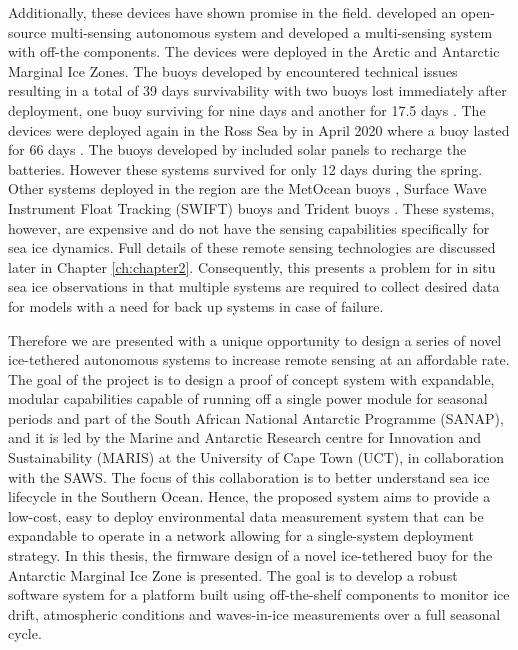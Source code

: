 Additionally, these devices have shown promise in the field. \textcite{rabault2019open} developed an open-source multi-sensing autonomous system and \textcite{kohout2015device} developed a multi-sensing system with off-the components. The devices were deployed in the Arctic and Antarctic Marginal Ice Zones. The buoys developed by \textcite{kohout2015device} encountered technical issues resulting in a total of 39 days survivability with two buoys lost immediately after deployment, one buoy surviving for nine days and another for 17.5 days \cite{kohout2015device}. The devices were deployed again in the Ross Sea by \textcite{kohout_smith_roach_williams_montiel_williams_2020} in April 2020 where a buoy lasted for 66 days \cite{kohout_smith_roach_williams_montiel_williams_2020}. The buoys developed by \textcite{rabault2019open} included solar panels to recharge the batteries. However these systems survived for only 12 days during the spring. Other systems deployed in the region are the MetOcean buoys \cite{uptempo}, Surface Wave Instrument Float Tracking (SWIFT) \cite{thomson2012wave} buoys and Trident buoys \cite{trident}. These systems, however, are expensive and do not have the sensing capabilities specifically for sea ice dynamics. Full details of these remote sensing technologies are discussed later in Chapter \ref{ch:chapter2}. Consequently, this presents a problem for in situ sea ice observations in that multiple systems are required to collect desired data for models with a need for back up systems in case of failure. 

Therefore we are presented with a unique opportunity to design a series of novel ice-tethered autonomous systems to increase remote sensing at an affordable rate. The goal of the project is to design a proof of concept system with expandable, modular capabilities capable of running off a single power module for seasonal periods and part of the South African National Antarctic Programme (SANAP), and it is led by the Marine and Antarctic Research centre for Innovation and Sustainability (MARIS) at the University of Cape Town (UCT), in collaboration with the SAWS. The focus of this collaboration is to better understand sea ice lifecycle in the Southern Ocean. Hence, the proposed system aims to provide a low-cost, easy to deploy environmental data measurement system that can be expandable to operate in a network allowing for a single-system deployment strategy. In this thesis, the firmware design of a novel ice-tethered buoy for the Antarctic Marginal Ice Zone is presented. The goal is to develop a robust software system  for a platform built using off-the-shelf components to monitor ice drift, atmospheric conditions and waves-in-ice measurements over a full seasonal cycle.

